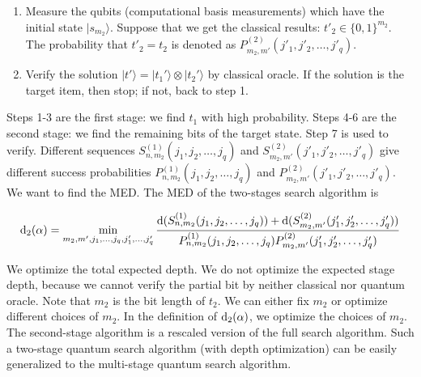 \documentclass[%
 twocolumn,
 10pt,
 superscriptaddress,
 longbibliography,
 amsmath,amssymb,
 aps,
 pra,
floatfix,
]{revtex4-1}
\begin{document}
\begin{enumerate}[Step 1:]
    \item Measure the qubits (computational basis measurements) which have the initial state $|s_{m_2}\rangle$. Suppose that we get the classical results: $t'_2\in\{0,1\}^{m_2}$. The probability that $t'_2=t_2$ is denoted as $P^{(2)}_{m_2,m'}(j'_1,j'_2,\ldots,j'_q)$.
    
    \item Verify the solution $|t'\rangle = |t_1'\rangle\otimes|t_2'\rangle$ by classical oracle. If the solution is the target item, then stop; if not, back to step 1.
\end{enumerate}

Steps 1-3 are the first stage: we find $t_1$ with high probability. Steps 4-6 are the second stage: we find the remaining bits of the target state. Step 7 is used to verify. Different sequences $S^{(1)}_{n,m_2}(j_1,j_2,\ldots,j_q)$ and $S^{(2)}_{m_2,m'}(j'_1,j'_2,\ldots,j'_q)$ give different success probabilities $P^{(1)}_{n,m_2}(j_1,j_2,\ldots,j_q)$ and $P^{(2)}_{m_2,m'}(j'_1,j'_2,\ldots,j'_q)$. We want to find the MED. The MED of the two-stages search algorithm is 
\begin{widetext}
\begin{equation}
\label{d 2 G}
   {\rm d}_2(\alpha) = \min_{m_2,m',j_1,\ldots,j_q,j'_1,\ldots,j'_q} \frac{{\rm d}(S^{(1)}_{n,m_2}(j_1,j_2,\ldots,j_q))+{\rm d}(S^{(2)}_{m_2,m'}(j'_1,j'_2,\ldots,j'_q))}{P^{(1)}_{n,m_2}(j_1,j_2,\ldots,j_q)P^{(2)}_{m_2,m'}(j'_1,j'_2,\ldots,j'_q)}
\end{equation}
\end{widetext}
We optimize the total expected depth. We do not optimize the expected stage depth, because we cannot verify the partial bit by neither classical nor quantum oracle. Note that $m_2$ is the bit length of $t_2$. We can either fix $m_2$ or optimize different choices of $m_2$. In the definition of ${\rm d}_2(\alpha)$, we optimize the choices of $m_2$. The second-stage algorithm is a rescaled version of the full search algorithm. Such a two-stage quantum search algorithm (with depth optimization) can be easily generalized to the multi-stage quantum search algorithm. 
\end{document}
